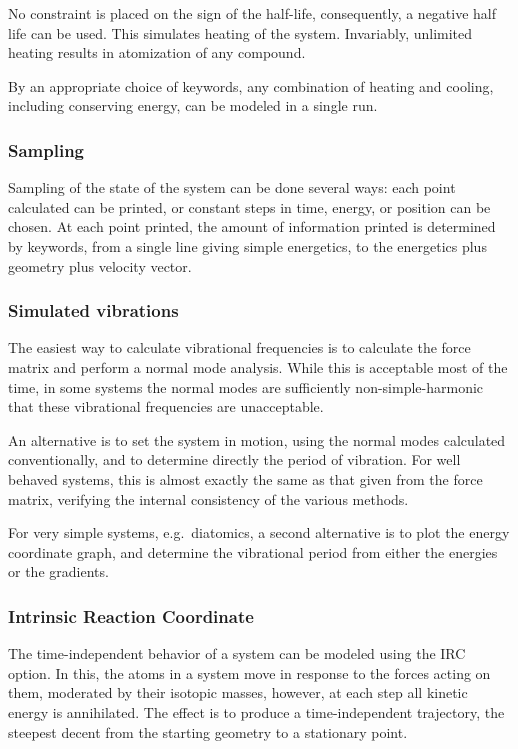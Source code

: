 No constraint is placed on the sign of the half-life, consequently, a negative half
life can be used.  This simulates heating of the system.  Invariably, unlimited
heating results in atomization of any compound.

By an appropriate choice of keywords, any combination of heating and cooling,
including conserving energy, can be modeled in a single run.

\subsubsection*{Sampling}

Sampling of the state of the system can be done several ways: each point
calculated can be printed, or constant steps in time, energy, or position can be
chosen.  At each point printed, the amount of information printed is determined
by keywords, from a single line giving simple energetics, to the energetics plus
geometry plus velocity vector.

\subsubsection*{Simulated vibrations}

The easiest way to calculate vibrational frequencies is to calculate the force
matrix and perform a normal mode analysis.  While this is acceptable most of
the time, in some systems the normal modes are sufficiently
non-simple-harmonic that these vibrational frequencies are unacceptable.

An alternative is to set the system in motion, using the normal modes
calculated  conventionally, and to determine directly the period of vibration.
For well  behaved systems, this is almost exactly the same as that given from
the force  matrix, verifying the internal consistency of the various methods.

For very simple systems, e.g.\ diatomics, a second alternative is to plot the
energy coordinate graph, and determine the vibrational period from either
the  energies or the gradients.

\subsubsection*{Intrinsic Reaction Coordinate}

The time-independent behavior of a system can be modeled using the IRC
option.  In this, the atoms in a system move in response to the forces acting
on  them, moderated by their isotopic masses, however, at each step all
kinetic  energy is annihilated.  The effect is to produce a time-independent
trajectory, the  steepest decent from the starting geometry to a stationary
point.

